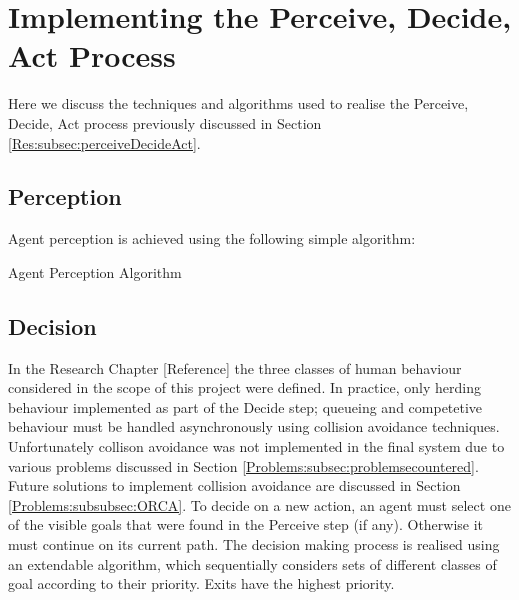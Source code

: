 \section{Implementing the Perceive, Decide, Act Process}
\label{Imp:sec:perceiveDecideAct}
Here we discuss the techniques and algorithms used to realise the Perceive, Decide, Act process previously discussed in Section \ref{Res:subsec:perceiveDecideAct}.

\subsection{Perception}
\label{Imp:subsec:perception}
Agent perception is achieved using the following simple algorithm:

\begin{algorithm}[H] %
 \SetAlgoLined
 \BlankLine
  \caption{Agent Perception Algorithm}
\end{algorithm}

\subsection{Decision}
\label{Imp:subsec:decision}
In the Research Chapter [Reference] the three classes of human behaviour considered in the scope of this project were defined. In practice, only herding behaviour implemented as part of the Decide step; queueing and competetive behaviour must be handled asynchronously using collision avoidance techniques. Unfortunately collison avoidance was not implemented in the final system due to various problems discussed in Section \ref{Problems:subsec:problemsecountered}. Future solutions to implement collision avoidance are discussed in Section \ref{Problems:subsubsec:ORCA}.
To decide on a new action, an agent must select one of the visible goals that were found in the Perceive step (if any). Otherwise it must continue on its current path. The decision making process is realised using an extendable algorithm, which sequentially considers sets of different classes of goal according to their priority. Exits have the highest priority.\\

